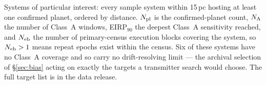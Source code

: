 \begin{table}
\centering
\scriptsize
\caption{Systems of particular interest: every sample system within
15\,pc hosting at least one confirmed planet, ordered by distance.
$N_{\rm pl}$ is the confirmed-planet count, $N_{\rm A}$ the number of
Class~A windows, EIRP$_{90}$ the deepest Class~A sensitivity reached, and
$N_{\rm eb}$ the number of primary-census execution blocks covering the
system, so $N_{\rm eb}>1$ means repeat epochs exist within the census.
Six of these systems have no Class~A coverage and so carry no
drift-resolving limit --- the archival selection of \S\ref{sec:bias} acting
on exactly the targets a transmitter search would choose. The full target
list is in the data release.}
\label{tab:interesting}

\end{table}


